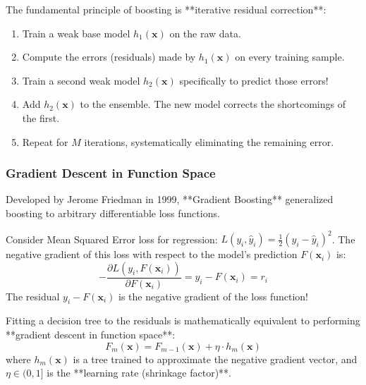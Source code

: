 The fundamental principle of boosting is **iterative residual correction**:
\begin{enumerate}
    \item Train a weak base model $h_1(\mathbf{x})$ on the raw data.
    \item Compute the errors (residuals) made by $h_1(\mathbf{x})$ on every training sample.
    \item Train a second weak model $h_2(\mathbf{x})$ specifically to predict those errors!
    \item Add $h_2(\mathbf{x})$ to the ensemble. The new model corrects the shortcomings of the first.
    \item Repeat for $M$ iterations, systematically eliminating the remaining error.
\end{enumerate}

\subsubsection{Gradient Descent in Function Space}
Developed by Jerome Friedman in 1999, **Gradient Boosting** generalized boosting to arbitrary differentiable loss functions.

Consider Mean Squared Error loss for regression: $L(y_i, \hat{y}_i) = \frac{1}{2}(y_i - \hat{y}_i)^2$. The negative gradient of this loss with respect to the model's prediction $F(\mathbf{x}_i)$ is:
\begin{equation}
-\frac{\partial L(y_i, F(\mathbf{x}_i))}{\partial F(\mathbf{x}_i)} = y_i - F(\mathbf{x}_i) = r_i\label{eq:mse_residual_gradient}
\end{equation}
The residual $y_i - F(\mathbf{x}_i)$ is the negative gradient of the loss function!

\begin{keyidea}
Fitting a decision tree to the residuals is mathematically equivalent to performing **gradient descent in function space**:
\begin{equation}
F_m(\mathbf{x}) = F_{m-1}(\mathbf{x}) + \eta \cdot h_m(\mathbf{x})\label{eq:gradient_boosting_additive}
\end{equation}
where $h_m(\mathbf{x})$ is a tree trained to approximate the negative gradient vector, and $\eta \in (0, 1]$ is the **learning rate (shrinkage factor)**.
\end{keyidea}

